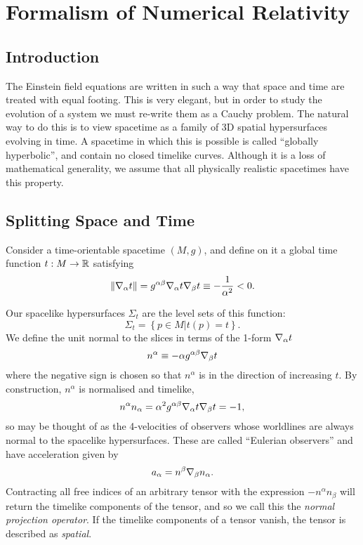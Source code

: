 


\chapter{Formalism of Numerical Relativity}      
     
\section{Introduction}     
The Einstein field equations are written in such a way that space and time are treated with equal footing. This is very elegant, but in order to study the evolution of a system we must re-write them as a Cauchy problem. The natural way to do this is to view spacetime as a family of 3D spatial hypersurfaces evolving in time. A spacetime in which this is possible is called ``globally hyperbolic'', and contain no closed timelike curves. Although it is a loss of mathematical generality, we assume that all physically realistic spacetimes have this property.

\section{Splitting Space and Time}
Consider a time-orientable spacetime $(M, g)$, and define on it a global time function $t:M \rightarrow {\mathbb R}$ satisfying
\begin{equation}\label{eq:gtf}
\| {\nabla}_\alpha t \|= g^{\alpha \beta}{\nabla}_\alpha t {\nabla}_\beta t \equiv -\frac{1}{\alpha^2} < 0.
\end{equation}

Our spacelike hypersurfaces $\Sigma_t$ are the level sets of this function:
\begin{equation}
\Sigma_{t} = \left\lbrace p \in M | t(p)=t \right\rbrace.
\end{equation}
We define the unit normal to the slices in terms of the 1-form  ${\nabla}_\alpha t$
\begin{equation}
n^\alpha \equiv -\alpha g^{\alpha \beta} {\nabla}_\beta t
\end{equation}
where the negative sign is chosen so that $n^{\alpha}$ is in the direction of increasing $t$. By construction, $n^{\alpha}$ is normalised and timelike,
\begin{equation}
n^{\alpha}n_{\alpha}=\alpha^2 g^{\alpha \beta} {\nabla}_\alpha t {\nabla}_\beta t =-1,
\end{equation}
so may be thought of as the 4-velocities of observers whose worldlines are always normal to the spacelike hypersurfaces. These are called ``Eulerian observers'' and have acceleration given by
\begin{equation}
\label{eq:NormalAcceleration}
a_{\alpha}= n^{\beta} {\nabla}_{\beta} n_{\alpha}.
\end{equation}
Contracting all free indices of an arbitrary tensor with the expression $-n^\alpha n_\beta$ will return the timelike components of the tensor, and so we call this the \textit{normal projection operator}. If the timelike components of a tensor vanish, the tensor is described as \textit{spatial}.

